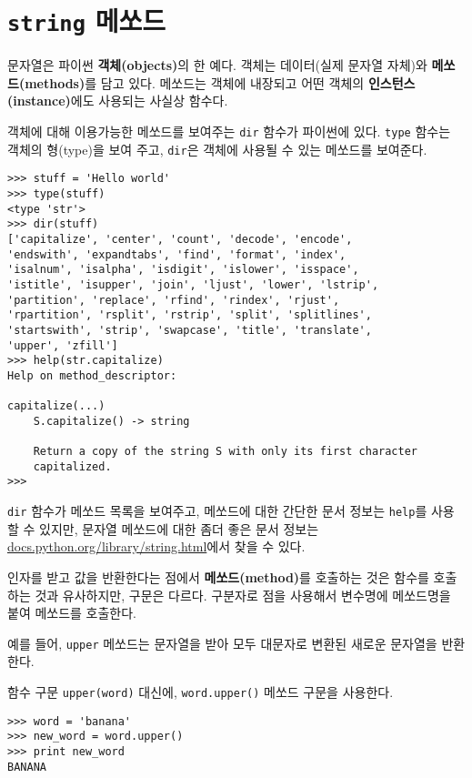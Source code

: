 \section{    {\tt string} 메쏘드}
문자열은 파이썬 {\bf 객체(objects)}의 한 예다. 
객체는 데이터(실제 문자열 자체)와 {\bf 메쏘드(methods)}를 담고 있다.
메쏘드는 객체에 내장되고 어떤 객체의 {\bf 인스턴스(instance)}에도 사용되는 사실상 함수다.

객체에 대해 이용가능한 메쏘드를 보여주는 {\tt dir} 함수가 파이썬에 있다.
{\tt type} 함수는 객체의 형(type)을 보여 주고, {\tt dir}은 객체에 사용될 수 있는 메쏘드를 보여준다.

\beforeverb
\begin{verbatim}
>>> stuff = 'Hello world'
>>> type(stuff)
<type 'str'>
>>> dir(stuff)
['capitalize', 'center', 'count', 'decode', 'encode', 
'endswith', 'expandtabs', 'find', 'format', 'index', 
'isalnum', 'isalpha', 'isdigit', 'islower', 'isspace', 
'istitle', 'isupper', 'join', 'ljust', 'lower', 'lstrip', 
'partition', 'replace', 'rfind', 'rindex', 'rjust', 
'rpartition', 'rsplit', 'rstrip', 'split', 'splitlines', 
'startswith', 'strip', 'swapcase', 'title', 'translate', 
'upper', 'zfill']
>>> help(str.capitalize)
Help on method_descriptor:

capitalize(...)
    S.capitalize() -> string
    
    Return a copy of the string S with only its first character
    capitalized.
>>>
\end{verbatim}
\afterverb
%

{\tt dir} 함수가 메쏘드 목록을 보여주고, 메쏘드에 대한 간단한 문서 정보는 {\tt help}를 사용할 수 있지만,
문자열 메쏘드에 대한 좀더 좋은 문서 정보는 \url{docs.python.org/library/string.html}에서 찾을 수 있다.

인자를 받고 값을 반환한다는 점에서 {\bf 메쏘드(method)}를 호출하는 것은 함수를 호출하는 것과 유사하지만, 구문은 다르다.
구분자로 점을 사용해서 변수명에 메쏘드명을 붙여 메쏘드를 호출한다.

예를 들어, {\tt upper} 메쏘드는 문자열을 받아 모두 대문자로 변환된 새로운 문자열을 반환한다.


함수 구문 {\tt upper(word)} 대신에, {\tt word.upper()} 메쏘드 구문을 사용한다.


\beforeverb
\begin{verbatim}
>>> word = 'banana'
>>> new_word = word.upper()
>>> print new_word
BANANA
\end{verbatim}
\afterverb
%

